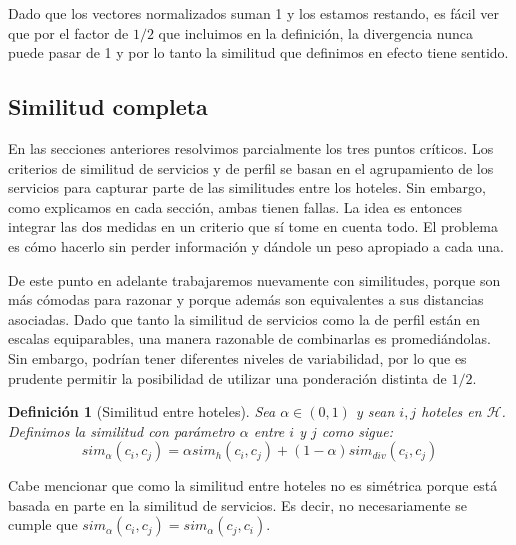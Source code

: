 \documentclass[12pt]{report}
\newtheorem{defn}{Definici\'on}[chapter]
\begin{document}
Dado que los vectores normalizados suman 1 y los estamos restando, es fácil ver que por el factor de $1/2$ que incluimos en la definición, la divergencia nunca puede pasar de 1 y por lo tanto la similitud que definimos en efecto tiene sentido.

\subsection*{Similitud completa}

En las secciones anteriores resolvimos parcialmente los tres puntos críticos. Los criterios de similitud de servicios y de perfil se basan en el agrupamiento de los servicios para capturar parte de las similitudes entre los hoteles. Sin embargo, como explicamos en cada sección, ambas tienen fallas. La idea es entonces integrar las dos medidas en un criterio que sí tome en cuenta todo. El problema es cómo hacerlo sin perder información y dándole un peso apropiado a cada una.

De este punto en adelante trabajaremos nuevamente con similitudes, porque son más cómodas para razonar y porque además son equivalentes a sus distancias asociadas. Dado que tanto la similitud de servicios como la de perfil están en escalas equiparables, una manera razonable de combinarlas es promediándolas. Sin embargo, podrían tener diferentes niveles de variabilidad, por lo que es prudente permitir la posibilidad de utilizar una ponderación distinta de $1/2$.
\begin{defn}[Similitud entre hoteles]
Sea $\alpha \in (0,1)$ y sean $i, j$ hoteles en $\mathcal{H}$. Definimos la similitud con parámetro $\alpha$ entre $i$ y $j$ como sigue:
\[
sim_\alpha(c_i, c_j) = \alpha sim_h(c_i, c_j) + (1 - \alpha) sim_{div}(c_i, c_j)
\]
\end{defn}
Cabe mencionar que como la similitud entre hoteles no es simétrica porque está basada en parte en la similitud de servicios. Es decir, no necesariamente se cumple que $sim_\alpha(c_i, c_j) = sim_\alpha(c_j, c_i)$.
\end{document}
